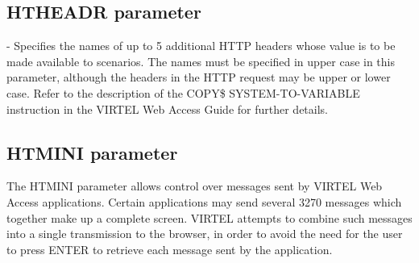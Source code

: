 \documentclass[letterpaper,10pt,english]{sphinxmanual}
\begin{document}

\subsection{HTHEADR parameter}
\label{\detokenize{Installation_Guide:index-76}}\label{\detokenize{Installation_Guide:htheadr-parameter}}
\begin{sphinxVerbatim}[commandchars=\\\{\}]
                
\end{sphinxVerbatim}

 - Specifies the names of up to 5 additional HTTP headers whose value is to be made available to scenarios. The names must be specified in upper case in this parameter, although the headers in the HTTP request may be upper or lower case. Refer to the description of the COPY\$ SYSTEM-TO-VARIABLE instruction in the VIRTEL Web Access Guide for further details.


\subsection{HTMINI parameter}
\label{\detokenize{Installation_Guide:index-77}}\label{\detokenize{Installation_Guide:htmini-parameter}}
\begin{sphinxVerbatim}[commandchars=\\\{\}]
                  
\end{sphinxVerbatim}

The HTMINI parameter allows control over messages sent by VIRTEL Web Access applications. Certain applications may send several 3270 messages which together make up a complete screen. VIRTEL attempts to combine such messages into a single transmission to the browser, in order to avoid the need for the user to press ENTER to retrieve each message sent by the application.
\end{document}
